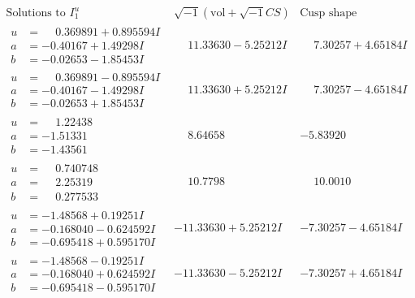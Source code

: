 \documentclass[1p]{elsarticle_modified}
\theoremstyle{definition}
\newcommand{\I}{\sqrt{-1}}
\begin{document}
$$\begin{array}{c|c|c}  
\text{Solutions to }I^u_{1}& \I (\text{vol} + \sqrt{-1}CS) & \text{Cusp shape}\\
 \hline 
\begin{aligned}
u &= \phantom{-}0.369891 + 0.895594 I \\
a &= -0.40167 + 1.49298 I \\
b &= -0.02653 - 1.85453 I\end{aligned}
 & \phantom{-}11.33630 - 5.25212 I & \phantom{-}7.30257 + 4.65184 I \\ \hline\begin{aligned}
u &= \phantom{-}0.369891 - 0.895594 I \\
a &= -0.40167 - 1.49298 I \\
b &= -0.02653 + 1.85453 I\end{aligned}
 & \phantom{-}11.33630 + 5.25212 I & \phantom{-}7.30257 - 4.65184 I \\ \hline\begin{aligned}
u &= \phantom{-}1.22438\phantom{ +0.000000I} \\
a &= -1.51331\phantom{ +0.000000I} \\
b &= -1.43561\phantom{ +0.000000I}\end{aligned}
 & \phantom{-}8.64658\phantom{ +0.000000I} & -5.83920\phantom{ +0.000000I} \\ \hline\begin{aligned}
u &= \phantom{-}0.740748\phantom{ +0.000000I} \\
a &= \phantom{-}2.25319\phantom{ +0.000000I} \\
b &= \phantom{-}0.277533\phantom{ +0.000000I}\end{aligned}
 & \phantom{-}10.7798\phantom{ +0.000000I} & \phantom{-}10.0010\phantom{ +0.000000I} \\ \hline\begin{aligned}
u &= -1.48568 + 0.19251 I \\
a &= -0.168040 - 0.624592 I \\
b &= -0.695418 + 0.595170 I\end{aligned}
 & -11.33630 + 5.25212 I & -7.30257 - 4.65184 I \\ \hline\begin{aligned}
u &= -1.48568 - 0.19251 I \\
a &= -0.168040 + 0.624592 I \\
b &= -0.695418 - 0.595170 I\end{aligned}
 & -11.33630 - 5.25212 I & -7.30257 + 4.65184 I \\ \hline\begin{aligned}

\end{aligned}
\end{array}$$
\end{document}
